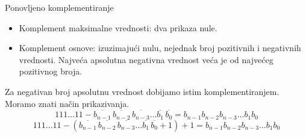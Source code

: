 \begin{frame}[label=04-s035]{Ponovljeno komplementiranje}
\begin{itemize}
\item Komplement maksimalne vrednosti: \alert{dva prikaza nule}.
\item Komplement osnove: izuzimajući nulu, nejednak broj pozitivnih i negativnih vrednosti. Najveća apsolutna negativna vrednost veća je od najvećeg pozitivnog broja.
\end{itemize}
Za negativan broj apsolutnu vrednost dobijamo istim komplementiranjem. Moramo znati način prikazivanja.
{\fontsize{10}{12}\selectfont
\[111\ldots11-\overline{b_{n-1}}\,\overline{b_{n-2}}\,\overline{b_{n-3}}\ldots\overline{b_1}\,\overline{b_0}=b_{n-1}b_{n-2}b_{n-3}\ldots b_1b_0\]
\[111\ldots11-\left(\overline{b_{n-1}}\,\overline{b_{n-2}}\,\overline{b_{n-3}}\ldots\overline{b_1}\,\overline{b_0}+1\right)+1=b_{n-1}b_{n-2}b_{n-3}\ldots b_1b_0\]}

\end{frame}
